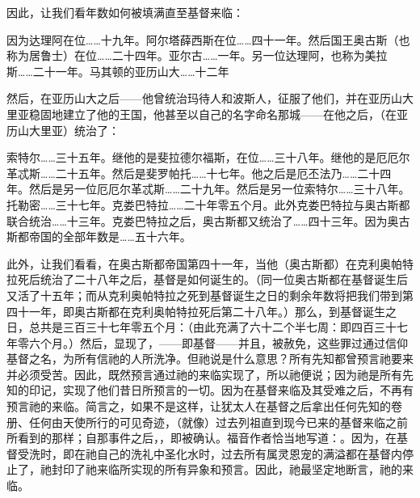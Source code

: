 因此，让我们看年数如何被填满直至基督来临：\par

因为达理阿在位……十九年。\newline{}阿尔塔薛西斯在位……四十一年。\newline{}然后国王奥古斯（也称为居鲁士）在位……二十四年。\newline{}亚尔古……一年。\newline{}另一位达理阿，也称为美拉斯……二十一年。\newline{}马其顿的亚历山大……十二年\par

然后，在亚历山大之后——他曾统治玛待人和波斯人，征服了他们，并在亚历山大里亚稳固地建立了他的王国，他甚至以自己的名字命名那城——在他之后，（在亚历山大里亚）统治了：\par

索特尔……三十五年。\newline{}继他的是斐拉德尔福斯，在位……三十八年。\newline{}继他的是厄厄尔革忒斯……二十五年。\newline{}然后是斐罗帕托……十七年。\newline{}他之后是厄丕法乃……二十四年。\newline{}然后是另一位厄厄尔革忒斯……二十九年。\newline{}然后是另一位索特尔……三十八年。\newline{}托勒密……三十七年。\newline{}克娄巴特拉……二十年零五个月。\newline{}此外克娄巴特拉与奥古斯都联合统治……十三年。\newline{}克娄巴特拉之后，奥古斯都又统治了……四十三年。\newline{}因为奥古斯都帝国的全部年数是……五十六年。\par

此外，让我们看看，在奥古斯都帝国第四十一年，当他（奥古斯都）在克利奥帕特拉死后统治了二十八年之后，基督是如何诞生的。（同一位奥古斯都在基督诞生后又活了十五年；而从克利奥帕特拉之死到基督诞生之日的剩余年数将把我们带到第四十一年，即奥古斯都在克利奥帕特拉死后第二十八年。）那么，到基督诞生之日，总共是三百三十七年零五个月：（由此充满了六十二个半七周：即四百三十七年零六个月。）然后，显现了，——即基督——并且，被赦免，这些罪过通过信仰基督之名，为所有信祂的人所洗净。但祂说是什么意思？所有先知都曾预言祂要来并必须受苦。因此，既然预言通过祂的来临实现了，所以祂便说；因为祂是所有先知的印记，实现了他们昔日所预言的一切。因为在基督来临及其受难之后，不再有预言祂的来临。简言之，如果不是这样，让犹太人在基督之后拿出任何先知的卷册、任何由天使所行的可见奇迹，（就像）过去列祖直到现今已来的基督来临之前所看到的那样；自那事件之后，，即被确认。福音作者恰当地写道：。因为，在基督受洗时，即在祂自己的洗礼中圣化水时，过去所有属灵恩宠的满溢都在基督内停止了，祂封印了祂来临所实现的所有异象和预言。因此，祂最坚定地断言，祂的来临。\par


